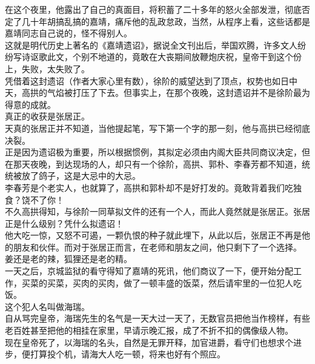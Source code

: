 \begin{multicols}{\theparacolNo}
在这个夜里，他露出了自己的真面目，将积蓄了二十多年的怒火全部发泄，彻底否定了几十年胡搞乱搞的嘉靖，痛斥他的乱政怠政，当然，从程序上看，这些话都是嘉靖同志自己说的，怪不得别人。\\

这就是明代历史上著名的《嘉靖遗诏》，据说全文刊出后，举国欢腾，许多文人纷纷写诗讴歌此文，个别不地道的，竟敢在大丧期间放鞭炮庆祝，皇帝干到这个份上，失败，太失败了。\\

凭借着这封遗诏（作者大家心里有数），徐阶的威望达到了顶点，权势也如日中天，高拱的气焰被打压了下去。但事实上，在那个夜晚，这封遗诏并不是徐阶最为得意的成就。\\

真正的收获是张居正。\\

天真的张居正并不知道，当他提起笔，写下第一个字的那一刻，他与高拱已经彻底决裂。\\

正是因为遗诏极为重要，所以根据惯例，其拟定必须由内阁大臣共同商议决定，但在那天夜晚，到达现场的人，却只有一个徐阶，高拱、郭朴、李春芳都不知道，统统被放了鸽子，这是大忌中的大忌。\\

李春芳是个老实人，也就算了，高拱和郭朴却不是好打发的。竟敢背着我们吃独食？饶不了你！\\

不久高拱得知，与徐阶一同草拟文件的还有一个人，而此人竟然就是张居正。张居正是什么级别？凭什么拟遗诏！\\

他大吃一惊，又怒不可遏，一颗仇恨的种子就此埋下，从此以后，张居正不再是他的朋友和伙伴。而对于张居正而言，在老师和朋友之间，他只剩下了一个选择。\\

姜还是老的辣，狐狸还是老的精。\\

一天之后，京城监狱的看守得知了嘉靖的死讯，他们商议了一下，便开始分配工作，买菜的买菜，买肉的买肉，做了一顿丰盛的饭菜，然后请牢里的一位犯人吃饭。\\

这个犯人名叫做海瑞。\\

自从骂完皇帝，海瑞先生的名气是一天大过一天了，无数官员把他当作榜样，有些老百姓甚至把他的相挂在家里，早请示晚汇报，成了不折不扣的偶像级人物。\\

现在皇帝死了，以海瑞的名头，自然是无罪开释，加官进爵，看守们也想求个进步，便打算投个机，请海大人吃一顿，将来也好有个照应。\\


\end{multicols}
